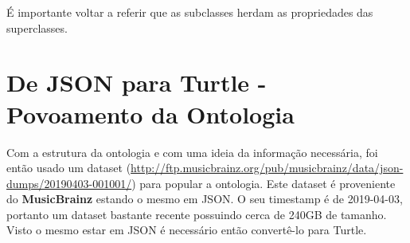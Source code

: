 \documentclass{article}
\begin{document}
É importante voltar a referir que as subclasses herdam as propriedades das superclasses.

\section{De JSON para Turtle - Povoamento da Ontologia}

Com a estrutura da ontologia e com uma ideia da informação necessária, foi então usado um dataset (\url{http://ftp.musicbrainz.org/pub/musicbrainz/data/json-dumps/20190403-001001/}) para popular a ontologia. Este dataset é proveniente do \textbf{MusicBrainz} estando o mesmo em JSON. O seu timestamp é de 2019-04-03, portanto um dataset bastante recente possuindo cerca de 240GB de tamanho. Visto o mesmo estar em JSON é necessário então convertê-lo para Turtle.
\end{document}
